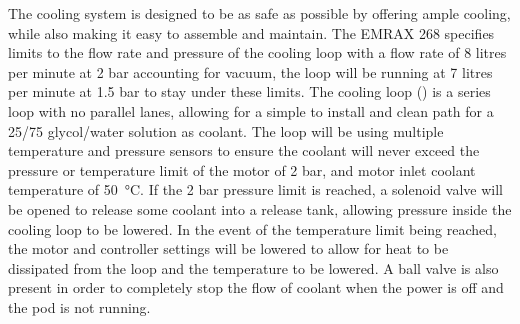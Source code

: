 \documentclass[main.tex]{subfiles}
\begin{document}
    The cooling system is designed to be as safe as possible by offering ample cooling, while also making it easy to assemble and maintain. The EMRAX 268 specifies limits to the flow rate and pressure of the cooling loop with a flow rate of 8 litres per minute at 2 bar accounting for vacuum, the loop will be running at 7 litres per minute at 1.5 bar to stay under these limits. The cooling loop () is a series loop with no parallel lanes, allowing for a simple to install and clean path for a 25/75 glycol/water solution as coolant. The loop will be using multiple temperature and pressure sensors to ensure the coolant will never exceed the pressure or temperature limit of the motor of 2 bar, and motor inlet coolant temperature of \SI{50}{\celsius}. If the 2 bar pressure limit is reached, a solenoid valve will be opened to release some coolant into a release tank, allowing pressure inside the cooling loop to be lowered. In the event of the temperature limit being reached, the motor and controller settings will be lowered to allow for heat to be dissipated from the loop and the temperature to be lowered. A ball valve is also present in order to completely stop the flow of coolant when the power is off and the pod is not running.\\
\end{document}
